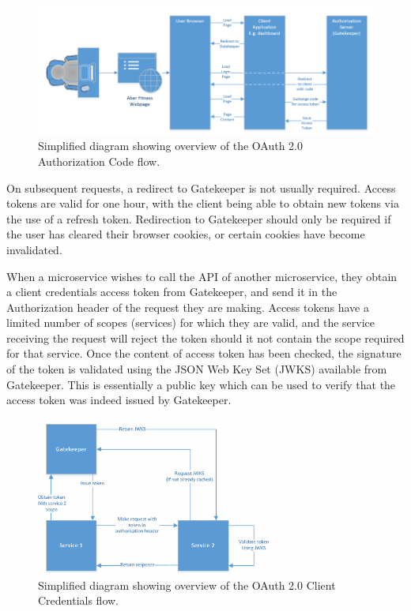 \begin{figure}[H]
    \centering
    \includegraphics[width=\textwidth]{Images/gatekeeper_authcode_flow.png}
    \caption{Simplified diagram showing overview of the OAuth 2.0 Authorization Code flow.}
\end{figure}

On subsequent requests, a redirect to Gatekeeper is not usually required. Access tokens are valid for one hour, with the client being able to obtain new tokens via the use of a refresh token. Redirection to Gatekeeper should only be required if the user has cleared their browser cookies, or certain cookies have become invalidated.

When a microservice wishes to call the API of another microservice, they obtain a client credentials access token from Gatekeeper, and send it in the Authorization header of the request they are making. Access tokens have a limited number of scopes (services) for which they are valid, and the service receiving the request will reject the token should it not contain the scope required for that service. Once the content of access token has been checked, the signature of the token is validated using the JSON Web Key Set (JWKS) available from Gatekeeper. This is essentially a public key which can be used to verify that the access token was indeed issued by Gatekeeper.

\begin{figure}[H]
    \centering
    \includegraphics[width=0.7\textwidth]{Images/gatekeeper_clientcredentials_flow.png}
    \caption{Simplified diagram showing overview of the OAuth 2.0 Client Credentials flow.}
\end{figure}

